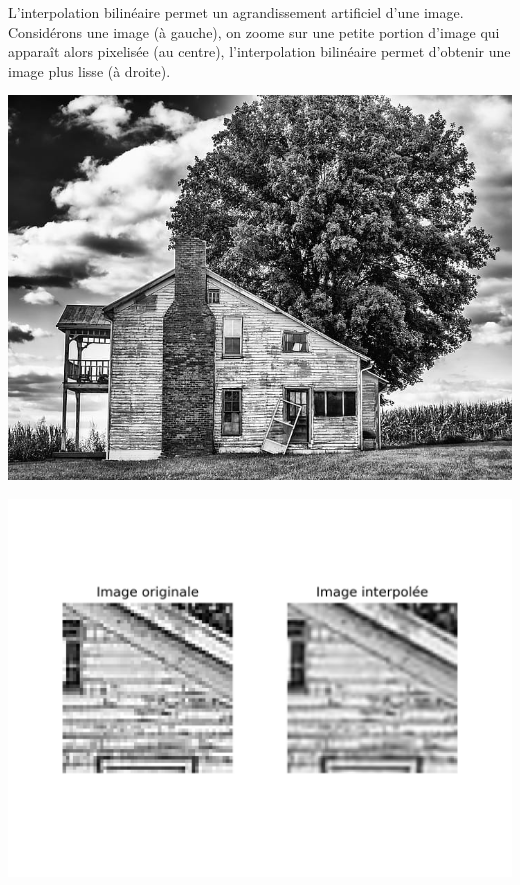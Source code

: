 \documentclass[11pt,class=report,crop=false]{standalone}
\begin{document}
L'interpolation bilinéaire permet un agrandissement artificiel d'une image.
Considérons une image (à gauche), on zoome sur une petite portion d'image qui apparaît alors pixelisée (au centre), l'interpolation bilinéaire permet d'obtenir une image plus lisse (à droite).
\begin{center}
	\begin{minipage}{0.32\textwidth}
	\includegraphics[scale=\myscale,scale=0.22]{figures/image_maison} 
	\end{minipage} 
	\begin{minipage}{0.66\textwidth}
	\includegraphics[scale=\myscale,scale=0.8,trim={0 2cm 0 2cm},clip]{figures/interpolation_bilineaire_2}  
	\end{minipage}
\end{center}
\end{document}
